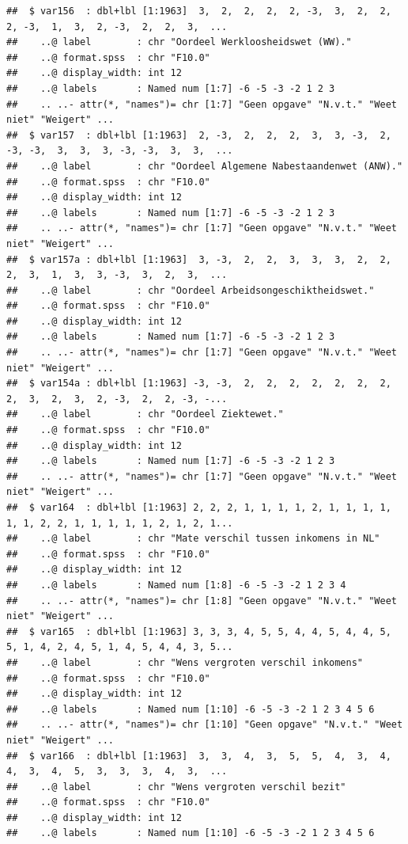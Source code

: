 \documentclass[
]{book}
\begin{document}
\begin{verbatim}
##  $ var156  : dbl+lbl [1:1963]  3,  2,  2,  2,  2, -3,  3,  2,  2,  2, -3,  1,  3,  2, -3,  2,  2,  3,  ...
##    ..@ label        : chr "Oordeel Werkloosheidswet (WW)."
##    ..@ format.spss  : chr "F10.0"
##    ..@ display_width: int 12
##    ..@ labels       : Named num [1:7] -6 -5 -3 -2 1 2 3
##    .. ..- attr(*, "names")= chr [1:7] "Geen opgave" "N.v.t." "Weet niet" "Weigert" ...
##  $ var157  : dbl+lbl [1:1963]  2, -3,  2,  2,  2,  3,  3, -3,  2, -3, -3,  3,  3,  3, -3, -3,  3,  3,  ...
##    ..@ label        : chr "Oordeel Algemene Nabestaandenwet (ANW)."
##    ..@ format.spss  : chr "F10.0"
##    ..@ display_width: int 12
##    ..@ labels       : Named num [1:7] -6 -5 -3 -2 1 2 3
##    .. ..- attr(*, "names")= chr [1:7] "Geen opgave" "N.v.t." "Weet niet" "Weigert" ...
##  $ var157a : dbl+lbl [1:1963]  3, -3,  2,  2,  3,  3,  3,  2,  2,  2,  3,  1,  3,  3, -3,  3,  2,  3,  ...
##    ..@ label        : chr "Oordeel Arbeidsongeschiktheidswet."
##    ..@ format.spss  : chr "F10.0"
##    ..@ display_width: int 12
##    ..@ labels       : Named num [1:7] -6 -5 -3 -2 1 2 3
##    .. ..- attr(*, "names")= chr [1:7] "Geen opgave" "N.v.t." "Weet niet" "Weigert" ...
##  $ var154a : dbl+lbl [1:1963] -3, -3,  2,  2,  2,  2,  2,  2,  2,  2,  3,  2,  3,  2, -3,  2,  2, -3, -...
##    ..@ label        : chr "Oordeel Ziektewet."
##    ..@ format.spss  : chr "F10.0"
##    ..@ display_width: int 12
##    ..@ labels       : Named num [1:7] -6 -5 -3 -2 1 2 3
##    .. ..- attr(*, "names")= chr [1:7] "Geen opgave" "N.v.t." "Weet niet" "Weigert" ...
##  $ var164  : dbl+lbl [1:1963] 2, 2, 2, 1, 1, 1, 1, 2, 1, 1, 1, 1, 1, 1, 2, 2, 1, 1, 1, 1, 1, 2, 1, 2, 1...
##    ..@ label        : chr "Mate verschil tussen inkomens in NL"
##    ..@ format.spss  : chr "F10.0"
##    ..@ display_width: int 12
##    ..@ labels       : Named num [1:8] -6 -5 -3 -2 1 2 3 4
##    .. ..- attr(*, "names")= chr [1:8] "Geen opgave" "N.v.t." "Weet niet" "Weigert" ...
##  $ var165  : dbl+lbl [1:1963] 3, 3, 3, 4, 5, 5, 4, 4, 5, 4, 4, 5, 5, 1, 4, 2, 4, 5, 1, 4, 5, 4, 4, 3, 5...
##    ..@ label        : chr "Wens vergroten verschil inkomens"
##    ..@ format.spss  : chr "F10.0"
##    ..@ display_width: int 12
##    ..@ labels       : Named num [1:10] -6 -5 -3 -2 1 2 3 4 5 6
##    .. ..- attr(*, "names")= chr [1:10] "Geen opgave" "N.v.t." "Weet niet" "Weigert" ...
##  $ var166  : dbl+lbl [1:1963]  3,  3,  4,  3,  5,  5,  4,  3,  4,  4,  3,  4,  5,  3,  3,  3,  4,  3,  ...
##    ..@ label        : chr "Wens vergroten verschil bezit"
##    ..@ format.spss  : chr "F10.0"
##    ..@ display_width: int 12
##    ..@ labels       : Named num [1:10] -6 -5 -3 -2 1 2 3 4 5 6

\end{verbatim}
\end{document}
